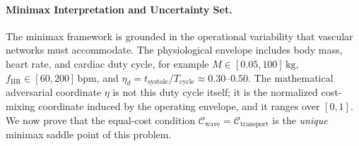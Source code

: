 \paragraph{Minimax Interpretation and Uncertainty Set.}

The minimax framework is grounded in the operational variability that vascular
networks must accommodate. The physiological envelope includes body mass,
heart rate, and cardiac duty cycle, for example $M \in [0.05,100]\,\text{kg}$,
$f_\mathrm{HR}\in[60,200]\,\text{bpm}$, and
$\eta_d=t_\mathrm{systole}/T_\mathrm{cycle}\approx0.30\text{--}0.50$. The
mathematical adversarial coordinate $\eta$ is not this duty cycle itself; it is
the normalized cost-mixing coordinate induced by the operating envelope, and it
ranges over $[0,1]$. We now prove that the equal-cost condition
$\mathcal{C}_{\mathrm{wave}} = \mathcal{C}_{\mathrm{transport}}$ is the
\emph{unique} minimax saddle point of this problem.

